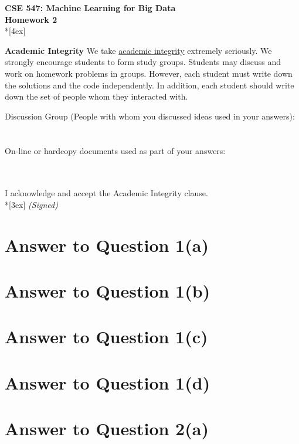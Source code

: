 \documentclass[11pt]{article}
\begin{document}
\thispagestyle{empty}
\parindent 0pt
\vfill
\large

\begin{center}
\LARGE{\bf \textsf{CSE 547: Machine Learning for Big Data}}\\ {\bf \textsf{Homework 2}} 
\\*[4ex]
\end{center}

\textbf{Academic Integrity} We take \href{https://www.cs.washington.edu/academics/misconduct}{academic integrity} extremely seriously. 
We strongly encourage students to form study groups. Students may discuss and work on homework problems in groups. However, each student must write down the solutions and the code independently. In addition, each student should write down the set of people whom they interacted with. 
\bigskip

Discussion Group (People with whom you discussed ideas used in your answers): \\\\\\
\vfill
On-line or hardcopy documents used as part of your answers: \\\\\\

\vfill

I acknowledge and accept the Academic Integrity clause.\\*[3ex]
\bigskip
\textit{(Signed)}\hrulefill

\pagebreak[4]
\section*{Answer to Question 1(a)}

\pagebreak[4]
\section*{Answer to Question 1(b)}

\pagebreak[4]
\section*{Answer to Question 1(c)}

\pagebreak[4]
\section*{Answer to Question 1(d)}

\pagebreak[4]
\section*{Answer to Question 2(a)}
\end{document}

